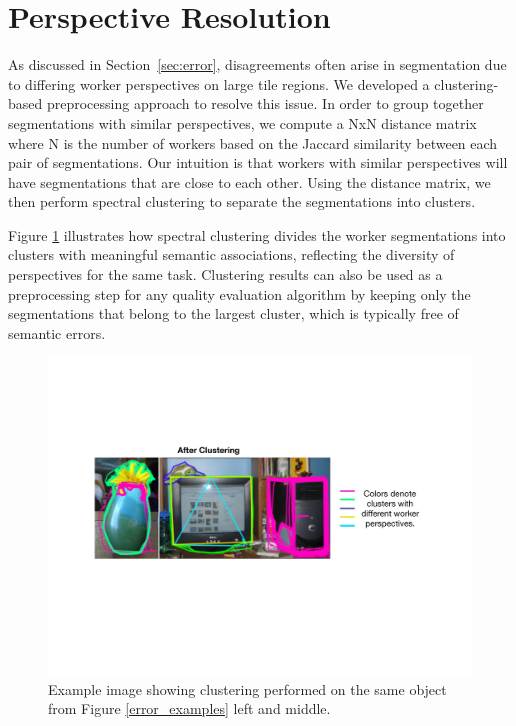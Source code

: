 \section{Perspective Resolution\label{perspective}}
\par As discussed in Section~\ref{sec:error}, disagreements often arise in segmentation due to differing worker perspectives on large tile regions. We developed a clustering-based preprocessing approach to resolve this issue. In order to group together segmentations with similar perspectives, we compute a NxN distance matrix where N is the number of workers based on the Jaccard similarity between each pair of segmentations. Our intuition is that workers with similar perspectives will have segmentations that are close to each other. Using the distance matrix, we then perform spectral clustering to separate the segmentations into clusters. 
\par Figure \ref{cluster_example} illustrates how spectral clustering divides the worker segmentations into clusters with meaningful semantic associations, reflecting the diversity of perspectives for the same task. Clustering results can also be used as a preprocessing step for any quality evaluation algorithm by keeping only the segmentations that belong to the largest cluster, which is typically free of semantic errors.
    \begin{figure}[h!]
      \centering
      \includegraphics[width=\linewidth]{plots/clustering.pdf}
      \caption{Example image showing clustering performed on the same object from Figure \ref{error_examples} left and middle.}
      \label{cluster_example}
    \end{figure}
